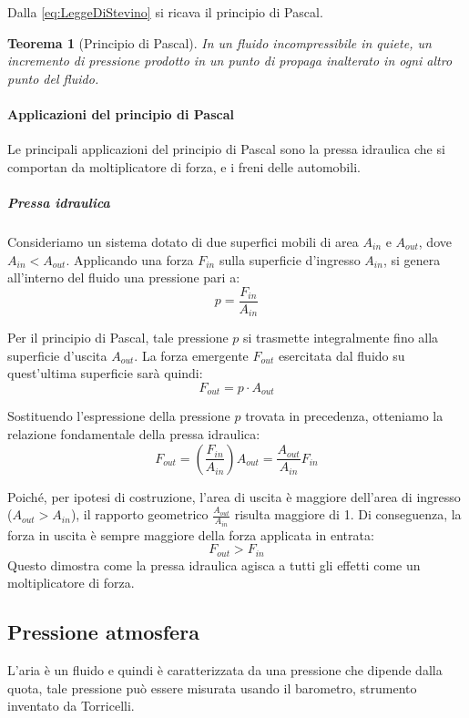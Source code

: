 \documentclass[11pt, a4paper, openright]{book}
\theoremstyle{plain}
\newtheorem{theorem}{Teorema}[section]
\theoremstyle{definition}
\begin{document}
Dalla \ref{eq:LeggeDiStevino} si ricava il principio di Pascal.
\begin{theorem}[Principio di Pascal]
    In un fluido incompressibile in quiete, un incremento di pressione prodotto in un punto di propaga inalterato in ogni altro punto del fluido.
\end{theorem}


\paragraph{Applicazioni del principio di Pascal}
Le principali applicazioni del principio di Pascal sono la pressa idraulica che si comportan da moltiplicatore di forza, e i freni delle automobili.

\subparagraph{Pressa idraulica}
Consideriamo un sistema dotato di due superfici mobili di area $A_{in}$ e $A_{out}$, dove $A_{in} < A_{out}$. Applicando una forza $F_{in}$ sulla superficie d'ingresso $A_{in}$, si genera all'interno del fluido una pressione pari a:
\begin{equation}
    p = \frac{F_{in}}{A_{in}}
\end{equation}

Per il principio di Pascal, tale pressione $p$ si trasmette integralmente fino alla superficie d'uscita $A_{out}$. La forza emergente $F_{out}$ esercitata dal fluido su quest'ultima superficie sarà quindi:
\begin{equation}
    F_{out} = p \cdot A_{out}
\end{equation}

Sostituendo l'espressione della pressione $p$ trovata in precedenza, otteniamo la relazione fondamentale della pressa idraulica:
\begin{equation}
    F_{out} = \left( \frac{F_{in}}{A_{in}} \right) A_{out} = \frac{A_{out}}{A_{in}} F_{in}
\end{equation}

Poiché, per ipotesi di costruzione, l'area di uscita è maggiore dell'area di ingresso ($A_{out} > A_{in}$), il rapporto geometrico $\frac{A_{out}}{A_{in}}$ risulta maggiore di 1. Di conseguenza, la forza in uscita è sempre maggiore della forza applicata in entrata:
\begin{equation}
    F_{out} > F_{in}
\end{equation}
Questo dimostra come la pressa idraulica agisca a tutti gli effetti come un moltiplicatore di forza.

\subsection{Pressione atmosfera}
L'aria è un fluido e quindi è caratterizzata da una pressione che dipende dalla quota, tale pressione può essere misurata usando il barometro, strumento inventato da Torricelli.
\end{document}
